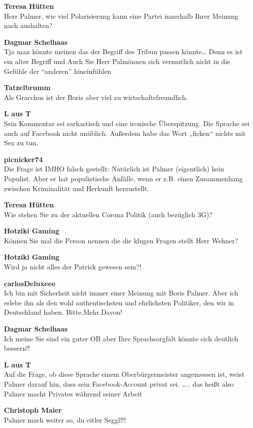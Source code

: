 \documentclass[a4,parindent=0pt]{article}
\begin{document}
\textbf{Teresa Hütten}\\
Herr Palmer, wie viel Polarisierung kann eine Partei innerhalb Ihrer
Meinung nach aushalten?

\textbf{Dagmar Schelhaas}\\
Tja man könnte meinen das der Begriff des Tribun passen könnte\ldots{}
Denn es ist ein alter Begriff und Auch Sie Herr Palmönnen sich
vermutlich nicht in die Gefühle der ``anderen'' hineinfühlen

\textbf{Tatzelbrumm}\\
Als Gracchus\cite{gracchus} ist der Boris aber viel zu
wirtschaftsfreundlich.

\textbf{L aus T}\\
Sein Kommentar sei sarkastisch und eine ironische Überspitzung. Die
Sprache sei auch auf Facebook nicht unüblich. Außerdem habe das Wort
„ficken`` nichts mit Sex zu tun.

\textbf{picnicker74}\\
Die Frage ist IMHO falsch gestellt: Natürlich ist Palmer (eigentlich)
kein Populist. Aber er hat populistische Anfälle, wenn er z.B. einen
Zusammenhang zwischen Kriminalität und Herkunft herzustellt.

\textbf{Teresa Hütten}\\
Wie stehen Sie zu der aktuellen Corona Politik (auch bezüglich 3G)?

\textbf{Hotziki Gaming}\\
Können Sie mal die Person nennen die die klugen Fragen stellt Herr
Wehner?

\textbf{Hotziki Gaming}\\
Wird ja nicht alles der Patrick gewesen sein?!

\textbf{carlosDeluxeee}\\
Ich bin mit Sicherheit nicht immer einer Meinung mit Boris Palmer. Aber
ich erlebe ihn als den wohl authentischsten und ehrlichsten Politiker,
den wir in Deutschland haben. Bitte.Mehr.Davon!

\textbf{Dagmar Schelhaas}\\
Ich meine Sie sind ein guter OB aber Ihre Sprachsorgfalt könnte sich
deutlich bessern!!

\textbf{L aus T}\\
Auf die Frage, ob diese Sprache einem Oberbürgermeister angemessen ist,
weist Palmer darauf hin, dass sein Facebook-Account privat sei.
\ldots{}.. das heißt also Palmer macht Privates während seiner Arbeit

\textbf{Christoph Maier}\\
Palmer mach weiter so, du eitler Seggl!!!
\end{document}
